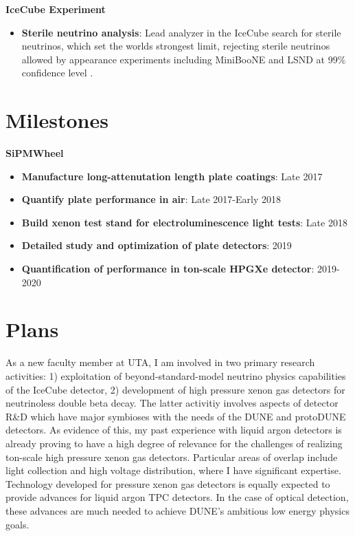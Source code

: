 \noindent\textbf{IceCube Experiment}
\begin{itemize}[noitemsep,nolistsep]
\item{\textbf{Sterile neutrino analysis}}: Lead analyzer in the IceCube search for sterile neutrinos, which  set the worlds strongest limit, rejecting sterile neutrinos allowed by appearance experiments including MiniBooNE and LSND at 99\% confidence level \cite{TheIceCube:2016oqi}.
\end{itemize}



\section*{\textbf{Milestones}}
\noindent\textbf{SiPMWheel}
\begin{itemize}[noitemsep,nolistsep]
\item{\textbf{Manufacture long-attenutation length plate coatings}}: Late 2017
\item{\textbf{Quantify plate performance in air}}: Late 2017-Early 2018
\item{\textbf{Build xenon test stand for electroluminescence light tests}}: Late 2018
\item{\textbf{Detailed study and optimization of plate detectors}}: 2019
\item{\textbf{Quantification of performance in ton-scale HPGXe detector}}: 2019-2020

\end{itemize}

\section*{\textbf{Plans}}
As a new faculty member at UTA, I am involved in two primary research activities: 1) exploitation of beyond-standard-model neutrino physics capabilities of the IceCube detector, 2) development of high pressure xenon gas detectors for neutrinoless double beta decay.  The latter activitiy involves aspects of detector R\&D which have major symbioses with the needs of the DUNE and protoDUNE detectors.  As evidence of this, my past experience with liquid argon detectors is already proving to have a high degree of relevance for the challenges of realizing ton-scale high pressure xenon gas detectors.  Particular areas of overlap include light collection and high voltage distribution, where I have significant expertise.  Technology developed for pressure xenon gas detectors is equally expected to provide advances for liquid argon TPC detectors.  In the case of optical detection, these advances are much needed to achieve DUNE's ambitious low energy physics goals.  

